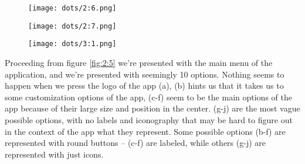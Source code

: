 \begin{figure}
\centering
\captionsetup{format=multiline,font=footnotesize}
\begin{minipage}{.33333\textwidth}
  \centering
  \texttt{[image: dots/2:6.png]}
  \label{fig:2:6}
\end{minipage}%
\begin{minipage}{.33333\textwidth}
  \centering
  \texttt{[image: dots/2:7.png]}
  \label{fig:2:7}
\end{minipage}%
\begin{minipage}{.33333\textwidth}
  \centering
  \texttt{[image: dots/3:1.png]}
  \label{fig:3:1}
\end{minipage}
\end{figure}

Proceeding from figure \ref{fig:2:5} we're presented with the main menu of the application, and we're presented with seemingly 10 options. Nothing seems to happen when we press the logo of the app (a), (b) hints us that it takes us to some customization options of the app, (c-f) seem to be the main options of the app because of their large size and position in the center. (g-j) are the most vague possible options, with no labels and iconography that may be hard to figure out in the context of the app what they represent. Some possible options (b-f) are represented with round buttons -- (c-f) are labeled, while others (g-j) are represented with just icons.
